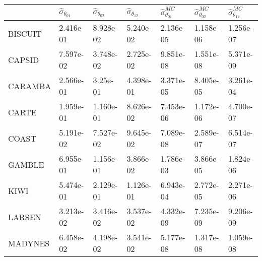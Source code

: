 \begin{tabular}{lllllll}
\toprule
{} & $\hat{\sigma}_{\theta_{01}}$ & $\hat{\sigma}_{\theta_{02}}$ & $\hat{\sigma}_{\theta_{12}}$ & $\hat{\sigma}^{MC}_{\theta_{01}}$ & $\hat{\sigma}^{MC}_{\theta_{02}}$ & $\hat{\sigma}^{MC}_{\theta_{12}}$ \\
\midrule
BISCUIT     &                    2.416e-01 &                    8.928e-02 &                    5.240e-02 &                         2.136e-05 &                         1.158e-06 &                         1.256e-07 \\
CAPSID      &                    7.597e-02 &                    3.748e-02 &                    2.725e-02 &                         9.851e-08 &                         1.551e-08 &                         5.371e-09 \\
CARAMBA     &                    2.566e-01 &                     3.25e-01 &                    4.398e-01 &                         3.371e-05 &                         8.405e-05 &                         3.261e-04 \\
CARTE       &                    1.959e-01 &                    1.160e-01 &                    8.626e-02 &                         7.453e-06 &                         1.172e-06 &                         4.700e-07 \\
COAST       &                    5.191e-02 &                    7.527e-02 &                    9.645e-02 &                         7.089e-08 &                         2.589e-07 &                         6.514e-07 \\
GAMBLE      &                    6.955e-01 &                    1.156e-01 &                    3.866e-02 &                         1.786e-03 &                         3.866e-05 &                         1.824e-06 \\
KIWI        &                    5.474e-01 &                    2.129e-01 &                    1.126e-01 &                         6.943e-04 &                         2.772e-05 &                         2.271e-06 \\
LARSEN      &                    3.213e-02 &                    3.416e-02 &                    3.537e-02 &                         4.332e-09 &                         7.235e-09 &                         9.206e-09 \\
MADYNES     &                    6.458e-02 &                    4.198e-02 &                    3.541e-02 &                         5.177e-08 &                         1.317e-08 &                         1.059e-08 \\

\end{tabular}
